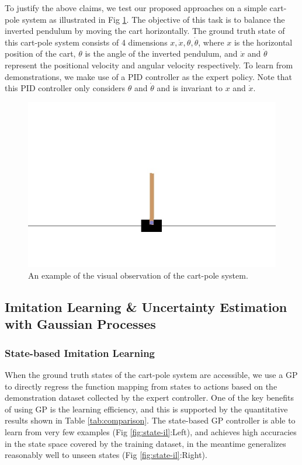 \documentclass[11pt, reqno, letterpaper, twoside]{amsart}
\begin{document}
To justify the above claims, we test our proposed approaches on a simple cart-pole system as illustrated in Fig \ref{fig:cart-pole}. The objective of this task is to balance the inverted pendulum by moving the cart horizontally. The ground truth state of this cart-pole system consists of 4 dimensions $x, \Dot{x}, \theta, \Dot{\theta}$, where $x$ is the horizontal position of the cart, $\theta$ is the angle of the inverted pendulum, and $\Dot{x}$ and $\Dot{\theta}$ represent the positional velocity and angular velocity respectively. To learn from demonstrations, we make use of a PID controller as the expert policy. Note that this PID controller only considers $\theta$ and $\Dot{\theta}$ and is invariant to $x$ and $\Dot{x}$.

\begin{figure}[ht]
	\centering
	\includegraphics[width=0.5\linewidth]{imgs/random_rollout3.jpg}
	\caption{An example of the visual observation of the cart-pole system.}
	\label{fig:cart-pole}
\end{figure}

\subsection{Imitation Learning \& Uncertainty Estimation with Gaussian Processes}
\subsubsection{State-based Imitation Learning}
When the ground truth states of the cart-pole system are accessible, we use a GP to directly regress the function mapping from states to actions based on the demonstration dataset collected by the expert controller. One of the key benefits of using GP is the learning efficiency, and this is supported by the quantitative results shown in Table \ref{tab:comparison}. The state-based GP controller is able to learn from very few examples (Fig \ref{fig:state-il}:Left), and achieves high accuracies in the state space covered by the training dataset, in the meantime generalizes reasonably well to unseen states (Fig \ref{fig:state-il}:Right).
\end{document}
